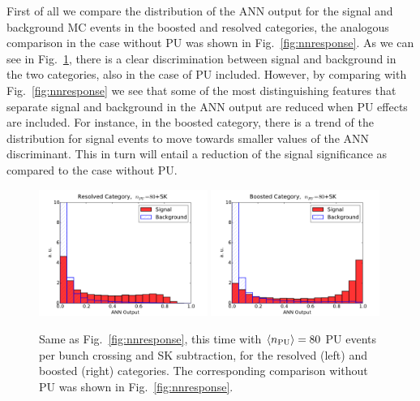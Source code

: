 First of all we compare the distribution of the ANN output for the
signal and background MC events in the boosted and resolved categories,
the analogous comparison in the case without PU was shown
in Fig.~\ref{fig:nnresponse}.
%
As we can see in Fig.~\ref{fig:nnresponse_PU}, there is a clear discrimination
between signal and background in the two categories, also
in the case of PU included.
%
However, by comparing with Fig.~\ref{fig:nnresponse} we see
that some of the most distinguishing features that separate signal
and background in the ANN output are reduced when PU effects
are included.
%
For instance, in the boosted category, there is a trend of the distribution
for signal events to move towards smaller values of the
ANN discriminant.
%
This in turn will entail a reduction of the signal significance as
compared to the case without PU.

\begin{figure}[t]
  \begin{center}
\includegraphics[width=0.49\textwidth]{plots/Resolved_disc_SKPU80.pdf}
\includegraphics[width=0.49\textwidth]{plots/Boosted_disc_SKPU80.pdf}
\caption{\small Same as Fig.~\ref{fig:nnresponse},
  this time with $\left\langle n_{\rm PU}\right\rangle=80$ PU events per bunch crossing
  and SK subtraction, for the resolved (left) and boosted
  (right) categories.
  The corresponding comparison without PU was shown in
  Fig.~\ref{fig:nnresponse}.
}
\label{fig:nnresponse_PU}
\end{center}
\end{figure}

